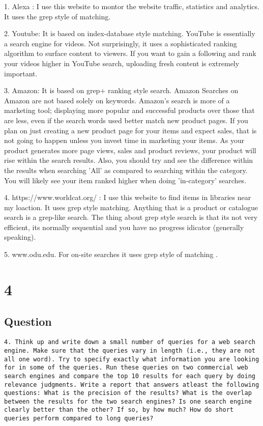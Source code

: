\documentclass[letterpaper,11pt]{article}
\begin{document}
1. Alexa : I use this website to montor the website traffic, statistics and analytics. It uses the grep style of matching.

2. Youtube: It is based on index-database style matching. YouTube is essentially a search engine for videos. Not surprisingly, it uses a sophisticated ranking algorithm to surface content to viewers. If you want to gain a following and rank your videos higher in YouTube search, uploading fresh content is extremely important.

3. Amazon: It is based on grep+ ranking style search. Amazon Searches on Amazon are not based solely on keywords. Amazon's search is more of a marketing tool; displaying more popular and successful products over those that are less, even if the search words used better match new product pages. If you plan on just creating a new product page for your items and expect sales, that is not going to happen unless you invest time in marketing your items. As your product generates more page views, sales and product reviews, your product will rise within the search results. Also, you should try and see the difference within the results when searching 'All' as compared to searching within the category. You will likely see your item ranked higher when doing 'in-category' searches.

4. https://www.worldcat.org/ : I use this website to find items in libraries near my loaction. It uses grep style matching. Anything that is a product or catalogue search is a grep-like search.  The thing about grep style search is that its not very efficient, its normally sequential and you have no progress idicator (generally speaking).

5. www.odu.edu. For on-site searches it uses grep style of matching .


\clearpage



\section*{4}

\subsection*{Question}

\begin{verbatim}
4. Think up and write down a small number of queries for a web search engine. Make sure that the queries vary in length (i.e., they are not all one word). Try to specify exactly what information you are looking for in some of the queries. Run these queries on two commercial web search engines and compare the top 10 results for each query by doing relevance judgments. Write a report that answers atleast the following questions: What is the precision of the results? What is the overlap between the results for the two search engines? Is one search engine clearly better than the other? If so, by how much? How do short queries perform compared to long queries?  
\end{verbatim}
\end{document}
